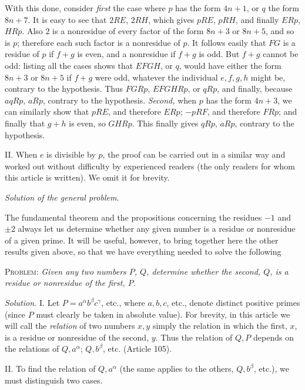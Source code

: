 With this done, consider \textit{first} the case where $p$ has the form $4n+1$, or $q$ the form $8n+7$. It is easy to see that $2RE$, $2RH$, which gives $pRE$, $pRH$, and finally $ERp$, $HRp$. Also $2$ is a nonresidue of every factor of the form $8n+3$ or $8n+5$, and so is $p$; therefore each such factor is a nonresidue of $p$. It follows easily that $FG$ is a residue of $p$ if $f+g$ is even, and a nonresidue if $f+g$ is odd. But $f+g$ cannot be odd: listing all the cases shows that $EFGH$, or $q$, would have either the form $8n+3$ or $8n+5$ if $f+g$ were odd, whatever the individual $e,f,g,h$ might be, contrary to the hypothesis. Thus $FGRp$, $EFGHRp$, or $qRp$, and finally, because $aqRp$, $aRp$, contrary to the hypothesis. \textit{Second,} when $p$ has the form $4n+3$, we can similarly show that $pRE$, and therefore $ERp$; $-pRF$, and therefore $FRp$; and finally that $g+h$ is even, so $GHRp$. This finally gives $qRp$, $aRp$, contrary to the hypothesis.

II. When $e$ is divisible by $p$, the proof can be carried out in a similar way and worked out without difficulty by experienced readers (the only readers for whom this article is written). We omit it for brevity.

\begin{center}\textit{Solution of the general problem.}\end{center}

The fundamental theorem and the propositions concerning the residues $-1$ and $\pm2$ always let us determine whether any given number is a residue or nonresidue of a given prime. It will be useful, however, to bring together here the other results given above, so that we have everything needed to solve the following

\textsc{Problem:} \textit{Given any two numbers $P$, $Q$, determine whether the second, $Q$, is a residue or nonresidue of the first, $P$.}

\textit{Solution.} I. Let $P=a^{\alpha}b^{\beta}c^{\gamma}$, etc., where $a,b,c$, etc., denote distinct positive primes (since $P$ must clearly be taken in absolute value). For brevity, in this article we will call the \textit{relation} of two numbers $x,y$ simply the relation in which the first, $x$, is a residue or nonresidue of the second, $y$. Thus the relation of $Q,P$ depends on the relations of $Q,a^{\alpha}$; $Q,b^{\beta}$, etc. (Article 105).

II. To find the relation of $Q,a^{\alpha}$ (the same applies to the others, $Q,b^{\beta}$, etc.), we must distinguish two cases.

